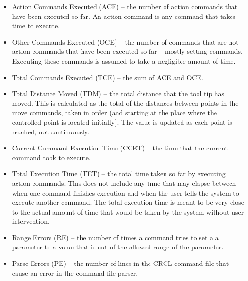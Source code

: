 \begin{itemize}

\item \sf Action Commands Executed (ACE) \rm -- the number of action commands that
  have been executed so far. An action command is any command that takes
  time to execute.\\

\item \sf Other Commands Executed (OCE) \rm -- the number of commands that are
  not action commands that have been executed so far -- mostly setting
  commands. Executing these commands is assumed to take a negligible amount
  of time.\\
   
 \item \sf Total Commands Executed (TCE) \rm -- the sum of ACE and OCE.\\

\item \sf Total Distance Moved (TDM) \rm -- the total distance that the
  tool tip has moved.  This is calculated as the total of the distances between 
  points in
  the move commands, taken in order (and starting at the place where the
  controlled point is located initially). The value is updated as each point
  is reached, not continuously.\\
  
 \item \sf Current Command Execution Time (CCET) \rm -- the time that the current
   command took to execute.\\
   
\item \sf Total Execution Time (TET) \rm -- the total time taken so far by
  executing action commands. This does not include any time that may elapse
  between when one command finishes execution and when the user tells the
  system to execute another command. The total execution time is
  meant to be very close to the actual amount of time that would be taken
  by the system without user intervention.\\

\item \sf Range Errors (RE) \rm -- the number of times a command tries to set a
  a parameter to a value that is out of the allowed range of the parameter.\\

\item \sf Parse Errors  (PE) \rm -- the number of lines in the CRCL command file
  that cause an error in the command file parser. \\


\end{itemize}
